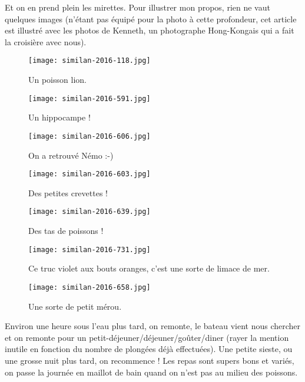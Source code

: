 \documentclass{book}
\begin{document}
Et on en prend plein les mirettes. Pour illustrer mon propos, rien ne vaut quelques images (n'étant pas équipé pour la photo à cette profondeur, cet article est illustré avec les photos de Kenneth, un photographe Hong-Kongais qui a fait la croisière avec nous).


\begin{figure}[h]
\centering
\texttt{[image: similan-2016-118.jpg]}
\caption*{Un poisson lion.}
\end{figure}


\begin{figure}[h]
\centering
\texttt{[image: similan-2016-591.jpg]}
\caption*{Un hippocampe !}
\end{figure}


\begin{figure}[h]
\centering
\texttt{[image: similan-2016-606.jpg]}
\caption*{On a retrouvé Némo :-)}
\end{figure}


\begin{figure}[h]
\centering
\texttt{[image: similan-2016-603.jpg]}
\caption*{Des petites crevettes !}
\end{figure}


\begin{figure}[h]
\centering
\texttt{[image: similan-2016-639.jpg]}
\caption*{Des tas de poissons !}
\end{figure}


\begin{figure}[h]
\centering
\texttt{[image: similan-2016-731.jpg]}
\caption*{Ce truc violet aux bouts oranges, c'est une sorte de limace de mer.}
\end{figure}


\begin{figure}[h]
\centering
\texttt{[image: similan-2016-658.jpg]}
\caption*{Une sorte de petit mérou.}
\end{figure}

Environ une heure sous l'eau plus tard, on remonte, le bateau vient nous chercher et on remonte pour un petit-déjeuner/déjeuner/goûter/diner (rayer la mention inutile en fonction du nombre de plongées déjà effectuées). Une petite sieste, ou une grosse nuit plus tard, on recommence ! Les repas sont supers bons et variés, on passe la journée en maillot de bain quand on n'est pas au milieu des poissons.
\end{document}
